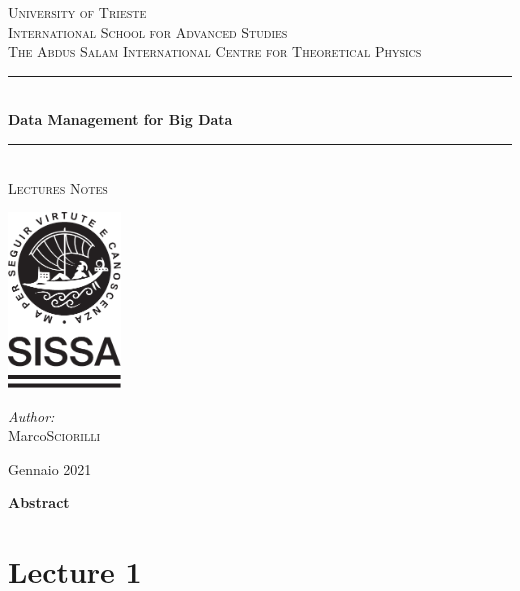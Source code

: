 \documentclass[11pt]{report}
\title{\thesistitle}
\author{\thesisauthorfirst\space\thesisauthorsecond}
\date{\thesisdate}
\def\thesistitle{Data Management for Big Data}
\def\thesisauthorfirst{Marco}
\def\thesisauthorsecond{Sciorilli}
\def\thesisdate{Gennaio 2021}
\theoremstyle{definition}
\theoremstyle{remark}
\begin{document}
\begin{titlepage}
	\thispagestyle{empty}
	\newcommand{\HRule}{\rule{\linewidth}{0.5mm}}
	\center
	\begin{flushleft}
	\textsc{University of Trieste}\\[.3cm]
	\textsc{International School for Advanced Studies}\\[.3cm]	
	\textsc{The Abdus Salam International Centre for Theoretical Physics}\\[.3cm]
	\end{flushleft}
	\HRule \\[0.7cm]
	{ \huge \bfseries \thesistitle }\\[0.1cm]
	\HRule \\[.7cm]
	\textsc{\large Lectures Notes}\\[2cm]
	\begin{minipage}{\textwidth}
	\begin{center}
	\hspace{0.9cm}
	\includegraphics[width=30mm,page=1]{Sigilli/SISSA official logo_0.pdf}\hspace{0.9cm}
	\\[6cm]
    \end{center}
	\begin{flushright} \large
	\emph{Author:}\\
	\thesisauthorfirst\space \textsc{\thesisauthorsecond}
	\end{flushright}
	\end{minipage}
	\vfill
	{\large \thesisdate}\\
	\clearpage
\end{titlepage}



\centerline{\large{\textbf{Abstract}}}
{\parindent0pt

}
\tableofcontents

\newpage


\chapter{Lecture 1}
\end{document}
